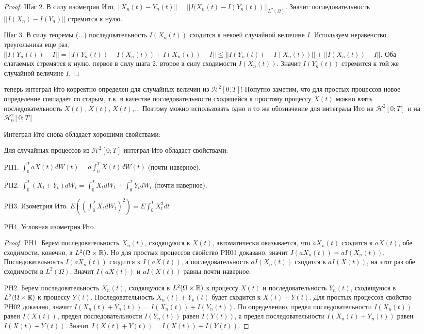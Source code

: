 {\begin{proof}
Шаг 2. В силу изометрии Ито, $||X_{n}(t)-Y_{n}(t)||=||I(X_{n}(t)-I(Y_{n}(t))||_{L^{2}(\Omega)}$. Значит последовательность $||I(X_{n})-I(Y_{n})||$ стремится к нулю.

Шаг 3. В силу теоремы (...) последовательность $I(X_{n}(t))$ сходится к некоей случайной величине $I$. Используем неравенство треугольника еще раз, $||I(Y_{n}(t))-I||=||I(Y_{n}(t))-I(X_{n}(t))+I(X_{n}(t))-I||\leq ||I(Y_{n}(t))-I(X_{n}(t))||+||I(X_{n}(t))-I||$. Оба слагаемых стремятся к нулю, первое в силу шага 2, второе в силу сходимости $I(X_{n}(t))$. Значит $I(Y_{n}(t))$ стремится к той же случайной величине $I$.
\end{proof}

теперь интеграл Ито корректно определен для случайных величин из $\mathcal{H}^{2}[0;T]$! Попутно заметим, что для простых процессов новое определение совпадает со старым, т.к. в качестве последовательности сходящейся к простому процессу $X(t)$ можно взять последовательность $X(t)$, $X(t)$, $X(t)$,... Поэтому можно использовать одно и то же обозначение для интеграла Ито на $\mathcal{H}^{2}[0;T]$ и на $\mathcal{H}_{0}^{2}[0;T]$

Интеграл Ито снова обладает хорошими свойствами:

\begin{myth} Для случайных процессов из $\mathcal{H}^{2}[0;T]$ интеграл Ито обладает свойствами:

PH1. $\int_{0}^{T}aX(t)dW(t)=a\int_{0}^{T}X(t)dW(t)$ (почти наверное).

PH2. $\int_{0}^{T}(X_{t}+Y_{t})dW_{t}=\int_{0}^{T}X_{t}dW_{t}+\int_{0}^{T}Y_{t}dW_{t}$ (почти наверное).

PH3. Изометрия Ито. $E\left((\int_{0}^{T}X_{t}dW_{t})^{2}\right)=E\int_{0}^{T}X_{t}^{2}dt$

PH4. Условная изометрия Ито.
\end{myth}
\begin{proof}

PH1. Берем последовательность $X_{n}(t)$, сходящуюся к $X(t)$, автоматически оказывается, что $aX_{n}(t)$ сходится к $aX(t)$, обе сходимости, конечно, в $L^{2}(\Omega\times \mathbb R)$. Но для простых процессов свойство PH01 доказано, значит $I(aX_{n}(t))=aI(X_{n}(t))$. Последовательность $I(aX_{n}(t))$ сходится к $I(aX(t))$, а последовательность $aI(X_{n}(t))$ сходится к $aI(X(t))$, на этот раз обе сходимости в $L^{2}(\Omega)$. Значит $I(aX(t))$ и $aI(X(t))$ равны почти наверное.

PH2. Берем последовательность $X_{n}(t)$, сходящуюся в $L^{2}(\Omega\times\mathbb R)$ к процессу $X(t)$ и последовательность $Y_{n}(t)$, сходящуюся в $L^{2}(\Omega\times\mathbb R)$ к процессу $Y(t)$. Последовательность $X_{n}(t)+Y_{n}(t)$ будет сходится к $X(t)+Y(t)$. Для простых процессов свойство PH02 доказано, значит $I(X_{n}(t)+Y_{n}(t))=I(X_{n}(t))+I(Y_{n}(t))$. По определению, предел последовательности $I(X_{n}(t))$ равен $I(X(t))$, предел последовательности $I(Y_{n}(t))$ равен $I(Y(t))$, а предел последовательности $I(X_{n}(t)+Y_{n}(t))$ равен $I(X(t)+Y(t))$. Значит $I(X(t)+Y(t))=I(X(t))+I(Y(t))$.


\end{proof}}
